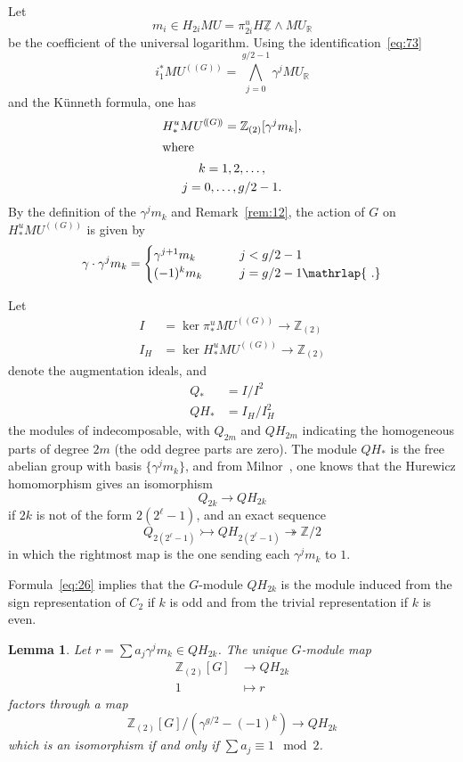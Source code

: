 \documentclass{amsart}
\newtheorem{lem}[equation]{Lemma}
\theoremstyle{definition}
\theoremstyle{remark}
\newcommand{\Z}{{\mathbb Z}}
\newcommand{\R}{{\mathbb R}}
\newcommand{\mur}{MU_{\R}}
\newcommand{\mutn}[1]{MU^{(\!(#1)\!)}}
\newcommand{\piu}{\pi^{u}}
\newcommand{\hu}{H^{{u}}}
\newcommand{\Zm}{\underline{\Z}}
\newcommand{\mm}{m}
\newcommand{\zlt}{\Z_{(2)}}
\newcommand{\zt}{C_{2}}
\begin{document}
 
Let 
\[
\mm_{i}\in H_{2i}MU = \piu_{2i}H\Zm\wedge \mur
\]
be the coefficient of the universal
logarithm.  Using the
identification~\eqref{eq:73}
\[
i_{1}^{\ast}\mutn{G} = \bigwedge_{j=0}^{g/2-1} \gamma^{j}\mur
\]
and the K\"unneth formula, one has
\begin{gather*}
\hu_{\ast}\mutn{G} = \zlt[\gamma^{j}m_{k}],
\\
\intertext{where}
k=1,2,\dots, \\
j = 0,\dots, g/2-1.
\end{gather*}
By the definition of the $\gamma^{j}m_{k}$ and Remark~\ref{rem:12},
the action of $G$ on $\hu_{\ast}\mutn{G}$ is given by
\begin{equation}\label{eq:26}
\gamma\cdot \gamma^{j}\mm_{k}=\begin{cases}
\gamma^{j+1}\mm_{k} &\qquad j < g/2-1 \\
(-1)^{k}\mm_{k} &\qquad j = g/2-1\mathrlap{\ .}
\end{cases}
\end{equation}

Let
\begin{align*}
I &=\ker \piu_{\ast}\mutn{G}\to \zlt \\
I_{H} &=\ker \hu_{\ast}\mutn{G}\to\zlt
\end{align*}
denote the augmentation ideals, and
\begin{align*}
Q_{\ast} &= I/I^{2} \\
QH_{\ast} &= I_{H}/I_{H}^{2}
\end{align*}
the modules of indecomposable, with $Q_{2m}$ and $QH_{2m}$ indicating
the homogeneous parts of degree $2m$ (the odd degree parts are zero).
The module $QH_{\ast}$ is the free abelian group with basis
$\{\gamma^{j}\mm_{k} \}$, and from Milnor~\cite{Mil:MU}, one knows
that the Hurewicz homomorphism gives an isomorphism
\[
Q_{2k}\to QH_{2k}
\]
if $2k$ is not of the form $2(2^{\ell}-1)$, and an exact sequence
\begin{equation}\label{eq:27}
Q_{2(2^{\ell}-1)}\rightarrowtail QH_{2(2^{\ell}-1)} \twoheadrightarrow \Z/2
\end{equation}
in which the rightmost map is the one sending each $\gamma^{j}\mm_{k}$ to $1$.

Formula~\eqref{eq:26} implies that the $G$-module $QH_{2k}$ is the
module induced from the sign representation of $\zt$ if $k$ is odd
and from the trivial representation if $k$ is even.

\begin{lem}
\label{thm:106} Let $r = \sum a_{j}\gamma^{j}\mm_{k}\in QH_{2k}$.  The unique
$G$-module map
\begin{align*}
\Z_{(2)}[G] &\to QH_{2k}  \\
1 &\mapsto r
\end{align*}
factors through a map
\[
\Z_{(2)}[G]/(\gamma^{g/2}-(-1)^{k}) \to QH_{2k}
\]
which is an isomorphism if and only if $\sum a_{j}\equiv 1 \mod 2$.
\end{lem}
\end{document}

